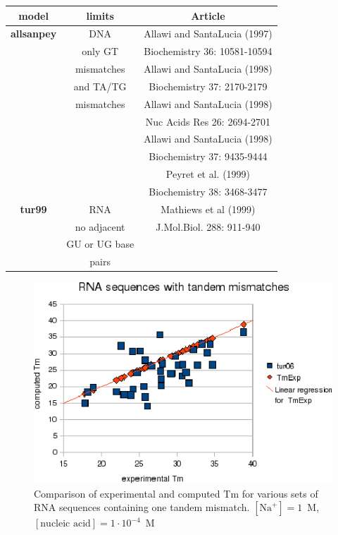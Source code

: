 \documentclass{article}
\begin{document}
\begin{table}[hc]
\begin{tabular}[h]{| c | c | c |}
\textbf{model} & \textbf{limits} & \textbf{Article} \\
 \hline
\textbf{allsanpey} & DNA & Allawi and SantaLucia (1997) \\
 & only GT & Biochemistry 36: 10581-10594 \\
 & mismatches & Allawi and SantaLucia (1998) \\
 & and TA/TG & Biochemistry 37: 2170-2179 \\
 & mismatches & Allawi and SantaLucia (1998) \\
 & & Nuc Acids Res 26: 2694-2701 \\
 & & Allawi and SantaLucia (1998) \\
 & & Biochemistry 37: 9435-9444 \\
 & & Peyret et al. (1999) \\
 & & Biochemistry 38: 3468-3477\\
 \hline
\textbf{tur99} & RNA & Mathiews et al (1999) \\
 & no adjacent & J.Mol.Biol.  288: 911-940 \\
 & GU or UG base & \\
 &  pairs & \\
 \hline
\end{tabular}
\end{table}

\begin{figure}[h]
\includegraphics[width=1\linewidth]{images/RNATandemMismatch}
\caption{Comparison of experimental and computed Tm for various sets of
 RNA sequences containing one tandem mismatch. $[\mbox{Na}^+] = 1$~M, $[\mbox{nucleic acid}] = 1\cdot{}10^{-4}$~M}
\end{figure}
\end{document}
